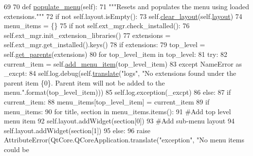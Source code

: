 \begin{DoxyCode}
69 
70     \textcolor{keyword}{def }\hyperlink{classcommotion__client_1_1GUI_1_1menu__bar_1_1MenuBar_a3ebeac5b69ad7004325183b547b3648a}{populate\_menu}(self):
71         \textcolor{stringliteral}{"""Resets and populates the menu using loaded extensions."""}
72         \textcolor{keywordflow}{if} \textcolor{keywordflow}{not} self.layout.isEmpty():
73             self.\hyperlink{classcommotion__client_1_1GUI_1_1menu__bar_1_1MenuBar_aef9fda2956e1fffd9abbfbe420716519}{clear\_layout}(self.\hyperlink{classcommotion__client_1_1GUI_1_1menu__bar_1_1MenuBar_a43b84a445a05f441662320e5f26b5599}{layout})
74         menu\_items = \{\}
75         \textcolor{keywordflow}{if} \textcolor{keywordflow}{not} self.ext\_mgr.check\_installed():
76             self.ext\_mgr.init\_extension\_libraries()
77         extensions = self.ext\_mgr.get\_installed().keys()
78         \textcolor{keywordflow}{if} extensions:
79             top\_level = self.\hyperlink{classcommotion__client_1_1GUI_1_1menu__bar_1_1MenuBar_a963ca3542a8f9ee6c8e8534fe530d443}{get\_parents}(extensions)
80             \textcolor{keywordflow}{for} top\_level\_item \textcolor{keywordflow}{in} top\_level:
81                 \textcolor{keywordflow}{try}:
82                     current\_item = self.\hyperlink{classcommotion__client_1_1GUI_1_1menu__bar_1_1MenuBar_a7bbc3f3ab719dadb7943780dd17f1e82}{add\_menu\_item}(top\_level\_item)
83                 \textcolor{keywordflow}{except} NameError \textcolor{keyword}{as} \_excpt:
84                     self.log.debug(self.\hyperlink{classcommotion__client_1_1GUI_1_1menu__bar_1_1MenuBar_ad97dbe989a68d0453584c7c95137b8b4}{translate}(\textcolor{stringliteral}{"logs"}, \textcolor{stringliteral}{"No extensions found under the parent
       item \{0\}. Parent item will not be added to the menu."}.format(top\_level\_item)))
85                     self.log.exception(\_excpt)
86                 \textcolor{keywordflow}{else}:
87                     \textcolor{keywordflow}{if} current\_item:
88                         menu\_items[top\_level\_item] = current\_item
89             \textcolor{keywordflow}{if} menu\_items:
90                 \textcolor{keywordflow}{for} title, section \textcolor{keywordflow}{in} menu\_items.items():
91                     \textcolor{comment}{#Add top level menu item}
92                     self.layout.addWidget(section[0])
93                     \textcolor{comment}{#Add sub-menu layout}
94                     self.layout.addWidget(section[1])
95             \textcolor{keywordflow}{else}:
96                 \textcolor{keywordflow}{raise} AttributeError(QtCore.QCoreApplication.translate(\textcolor{stringliteral}{"exception"}, \textcolor{stringliteral}{"No menu items could be
}
\end{DoxyCode}
